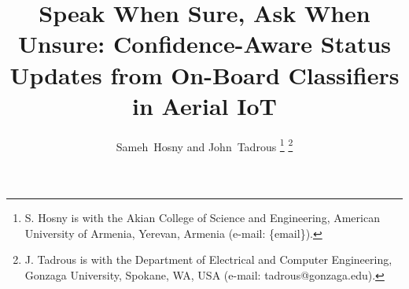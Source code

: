 \documentclass[journal]{IEEEtran}
\theoremstyle{remark}
\begin{document}
\title{Speak When Sure, Ask When Unsure: Confidence-Aware Status Updates from On-Board Classifiers in Aerial IoT}

\author{Sameh~Hosny and John~Tadrous%
\thanks{S. Hosny is with the Akian College of Science and Engineering, American University of Armenia, Yerevan, Armenia (e-mail: \{email\}).}%
\thanks{J. Tadrous is with the Department of Electrical and Computer Engineering, Gonzaga University, Spokane, WA, USA (e-mail: tadrous@gonzaga.edu).}}

\maketitle











\appendices




\end{document}
